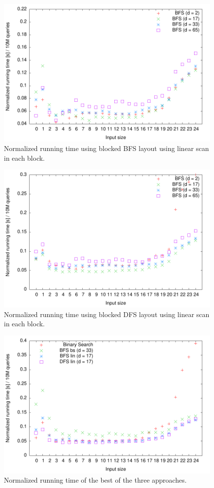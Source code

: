 \begin{figure}[h!]
  \label{fig:blocked_bfs_lin_runningtime}
  \centering
  \includegraphics[width=\textwidth]{../week1/plots/outputs/Btree_lin_runningtime}
  \caption{Normalized running time using blocked BFS layout using linear scan in each block.}
\end{figure}

\begin{figure}[h!]
  \label{fig:blocked_dfs_lin_runningtime}
  \centering
  \includegraphics[width=\textwidth]{../week1/plots/outputs/DFS_runningtime}
  \caption{Normalized running time using blocked DFS layout using linear scan in each block.}
\end{figure}

\begin{figure}[h!]
  \label{fig:champions}
  \centering
  \includegraphics[width=\textwidth]{../week1/plots/outputs/bfs_dfs_16_runningtime}
  \caption{Normalized running time of the best of the three approaches.}
\end{figure}

